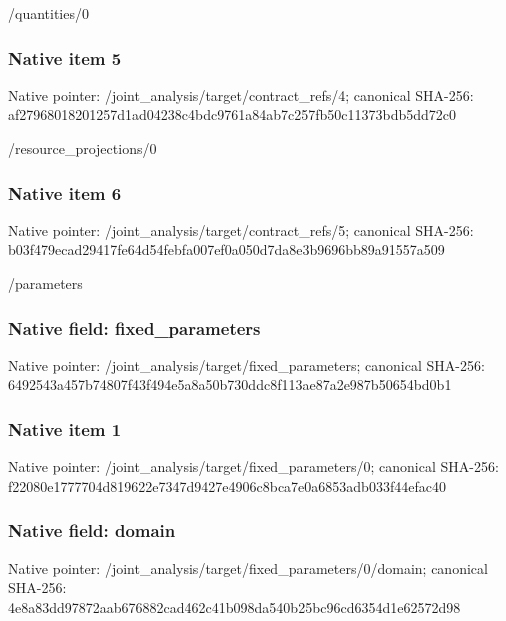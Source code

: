 \documentclass[10pt,a4paper]{article}
\begin{document}
\begingroup\raggedright\sloppy /\allowbreak{}quantities/\allowbreak{}0\par\endgroup

\subsubsection{Native item 5}
Native pointer: /joint\_\allowbreak{}analysis/target/contract\_\allowbreak{}refs/4; canonical SHA-256: af27968018201257d1ad04238c4bdc9761a84ab7c257fb50c11373bdb5dd72c0

\begingroup\raggedright\sloppy /\allowbreak{}resource\_\allowbreak{}projections/\allowbreak{}0\par\endgroup

\subsubsection{Native item 6}
Native pointer: /joint\_\allowbreak{}analysis/target/contract\_\allowbreak{}refs/5; canonical SHA-256: b03f479ecad29417fe64d54febfa007ef0a050d7da8e3b9696bb89a91557a509

\begingroup\raggedright\sloppy /\allowbreak{}parameters\par\endgroup

\subsubsection{Native field: fixed\_\allowbreak{}parameters}
Native pointer: /joint\_\allowbreak{}analysis/target/fixed\_\allowbreak{}parameters; canonical SHA-256: 6492543a457b74807f43f494e5a8a50b730ddc8f113ae87a2e987b50654bd0b1

\subsubsection{Native item 1}
Native pointer: /joint\_\allowbreak{}analysis/target/fixed\_\allowbreak{}parameters/0; canonical SHA-256: f22080e1777704d819622e7347d9427e4906c8bca7e0a6853adb033f44efac40

\subsubsection{Native field: domain}
Native pointer: /joint\_\allowbreak{}analysis/target/fixed\_\allowbreak{}parameters/0/domain; canonical SHA-256: 4e8a83dd97872aab676882cad462c41b098da540b25bc96cd6354d1e62572d98
\end{document}
